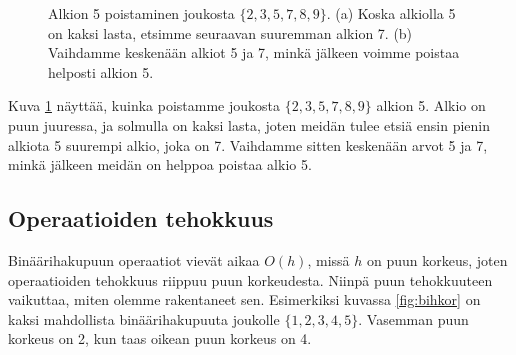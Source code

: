 \begin{figure}
\center
{}
\caption{Alkion 5 poistaminen joukosta $\{2,3,5,7,8,9\}$. (a) Koska alkiolla
5 on kaksi lasta, etsimme seuraavan suuremman alkion 7.
(b) Vaihdamme keskenään alkiot 5 ja 7, minkä jälkeen voimme poistaa helposti alkion 5.}
\label{fig:bihpu3}
\end{figure}

Kuva \ref{fig:bihpu3} näyttää, kuinka poistamme joukosta $\{2,3,5,7,8,9\}$ alkion 5.
Alkio on puun juuressa, ja solmulla on kaksi lasta,
joten meidän tulee etsiä ensin pienin alkiota 5 suurempi alkio,
joka on 7.
Vaihdamme sitten keskenään arvot 5 ja 7,
minkä jälkeen meidän on helppoa poistaa alkio 5.

\subsection{Operaatioiden tehokkuus}

Binäärihakupuun operaatiot vievät aikaa $O(h)$,
missä $h$ on puun korkeus, joten operaatioiden tehokkuus
riippuu puun korkeudesta.
Niinpä puun tehokkuuteen vaikuttaa, miten olemme
rakentaneet sen.
Esimerkiksi kuvassa \ref{fig:bihkor} on kaksi mahdollista
binäärihakupuuta joukolle $\{1,2,3,4,5\}$.
Vasemman puun korkeus on 2, kun taas oikean puun korkeus on 4.

